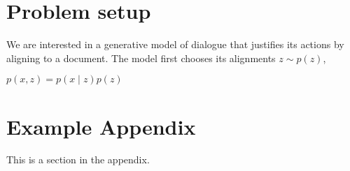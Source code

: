 \documentclass[11pt]{article}
\begin{document}
\section{Problem setup}
We are interested in a generative model of dialogue that justifies its actions by
aligning to a document.
The model first chooses its alignments $z \sim p(z)$,

$p(x,z) = p(x\mid z)p(z)$





\appendix

\section{Example Appendix}
\label{sec:appendix}

This is a section in the appendix.
\end{document}
